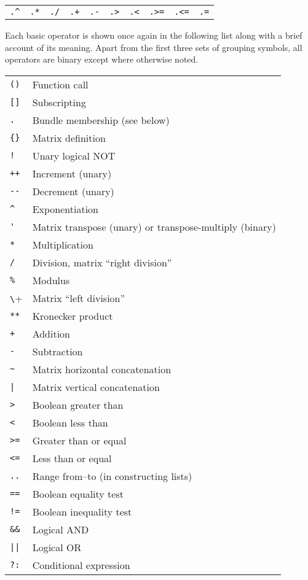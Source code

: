 \begin{center}
\begin{tabular}{cccccccccc}
\verb|.^| & \texttt{.*} & \texttt{./} & \texttt{.+} &
 \texttt{.-} & \verb|.>| & \verb|.<| & \verb|.>=| &
 \verb|.<=| & \texttt{.=} \\
\end{tabular}
\end{center}

Each basic operator is shown once again in the following list along
with a brief account of its meaning. Apart from the first three sets
of grouping symbols, all operators are binary except where otherwise
noted.

\begin{longtable}{ll}
\verb|()| & Function call \\
\verb|[]|  & Subscripting \\
\texttt{.} & Bundle membership (see below) \\
\verb|{}|  & Matrix definition \\
\texttt{!} & Unary logical NOT \\
\texttt{++} & Increment (unary) \\
\verb|--| & Decrement (unary) \\
\verb|^|  & Exponentiation \\
\verb|'|  & Matrix transpose (unary) or transpose-multiply (binary) \\
\texttt{*} & Multiplication \\
\texttt{/} & Division, matrix ``right division'' \\
\texttt{\%} & Modulus \\
\verb+\+    & Matrix ``left division'' \\
\texttt{**} & Kronecker product \\
\texttt{+} & Addition \\
\texttt{-} & Subtraction \\
\verb|~| & Matrix horizontal concatenation \\
\verb+|+ & Matrix vertical concatenation \\
\verb|>| & Boolean greater than \\
\verb|<| & Boolean less than \\
\verb|>=| & Greater than or equal \\
\verb|<=| & Less than or equal \\
\texttt{..} & Range from--to (in constructing lists) \\
\texttt{==} & Boolean equality test \\
\texttt{!=} & Boolean inequality test \\
\verb|&&| & Logical AND \\
\verb+||+ & Logical OR \\
\texttt{?:} & Conditional expression \\
\end{longtable}

